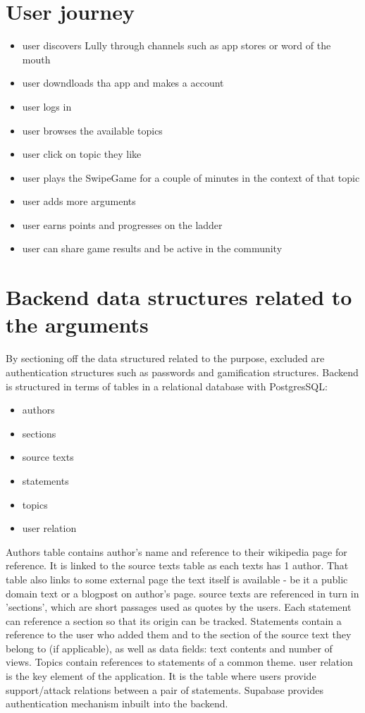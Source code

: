 \documentclass{article}
\begin{document}
\section{User journey}
\begin{itemize}
  \item user discovers Lully through channels such as app stores or word of the mouth
  \item user downdloads tha app and makes a account
  \item user logs in
  \item user browses the available topics
  \item user click on topic they like
  \item user plays the SwipeGame for a couple of minutes in the context of that topic
  \item user adds more arguments
  \item user earns points and progresses on the ladder
  \item user can share game results and be active in the community
\end{itemize}

\section{Backend data structures related to the arguments}
By sectioning off the data structured related to the purpose, excluded are authentication structures such as passwords and gamification structures.
Backend is structured in terms of tables in a relational database with PostgresSQL:
\begin{itemize}
  \item authors
  \item sections
  \item source texts
  \item statements
  \item topics
  \item user relation
\end{itemize}
Authors table contains author's name and reference to their wikipedia page for reference. It is linked to the source texts table as each texts has 1 author. That table also links to some external page the text itself is available - be it a public domain text or a blogpost on author's page. source texts are referenced in turn in 'sections', which are short passages used as quotes by the users.
Each statement can reference a section so that its origin can be tracked. Statements contain a reference to the user who added them and to the section of the source text they belong to (if applicable), as well as data fields: text contents and number of views. Topics contain references to statements of a common theme.
user relation is the key element of the application. It is the table where users provide support/attack relations between a pair of statements. 
Supabase provides authentication mechanism inbuilt into the backend.
\end{document}
